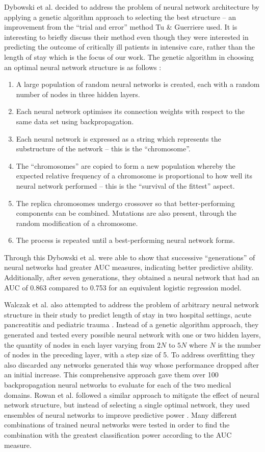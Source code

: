 Dybowski et al. decided to address the problem of neural network architecture
by applying a genetic algorithm approach to selecting the best
structure \citep{Dybowski1996} --
an improvement from the ``trial and error'' method Tu \& Guerriere used. It is
interesting to briefly discuss their method even though they were interested
in predicting the outcome of critically ill patients in intensive care, rather
than the length of stay which is the focus of our work. The genetic algorithm
in choosing an optimal neural network structure is as
follows \citep{Dybowski1996}:
\begin{enumerate}
\item A large population of random neural networks is created, each with
a random number of nodes in three hidden layers.
\item Each neural network optimises
its connection weights with respect to the same data set using
backpropagation.
\item Each neural network is expressed as a string which represents the
substructure of the network -- this is the ``chromosome''.
\item The ``chromosomes'' are copied to form a new population whereby the
expected relative frequency of a chromosome is proportional to how well
its neural network performed -- this is the ``survival of the fittest''
aspect.
\item The replica chromosomes undergo crossover so that better-performing
components can be combined. Mutations are also present, through the random
modification of a chromosome.
\item The process is repeated until a best-performing neural network forms.
\end{enumerate}
Through this Dybowski et al. were able to show that successive ``generations''
of neural networks had greater AUC measures, indicating better predictive
ability. Additionally, after seven generations, they obtained a neural network
that had an AUC of 0.863 compared to 0.753 for an equivalent logistic
regression model.

Walczak et al. also attempted to address the problem of arbitrary neural
network structure in their study to predict length of stay in two hospital
settings, acute pancreatitis and pediatric trauma \citep{Walczak2003}. Instead
of a genetic algorithm approach, they generated and tested every possible
neural network with one or two hidden layers, the quantity of nodes in each
layer varying from $2N$ to $5N$ where $N$ is the number of nodes in the
preceding layer, with a step size of 5. To address overfitting they also
discarded any networks generated this way whose performance dropped after
an initial increase. This comprehensive approach gave them over 100
backpropagation neural networks to evaluate for each of the two medical
domains. 
Rowan et al. followed a similar
approach to mitigate the effect of neural network structure, but instead of
selecting a single optimal network, they used ensembles of neural networks
to improve predictive power \citep{Rowan2007}. Many different combinations of
trained neural networks were tested in order to find the combination with the
greatest classification power according to the AUC measure.

